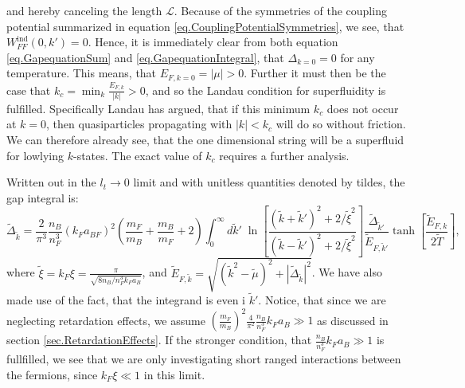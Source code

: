 and hereby canceling the length $\mathcal{L}$. Because of the symmetries of the coupling potential summarized in equation \eqref{eq.CouplingPotentialSymmetries}, we see, that $W^\text{ind}_{FF}(0,k') = 0$. Hence, it is immediately clear from both equation \eqref{eq.GapequationSum} and \eqref{eq.GapequationIntegral}, that $\Delta_{k=0} = 0$ for any temperature. This means, that $E_{F,k=0} = |\mu| > 0$. Further it must then be the case that $k_c = \min_k \frac{E_{F,k}}{|k|} > 0$, and so the Landau condition for superfluidity is fulfilled\cite{LandauStatPhys2,PlischkeStatPhys}.
Specifically Landau has argued, that if this minimum $k_c$ does not occur at $k=0$, then quasiparticles propagating with $|k|< k_c$ will do so without friction. We can therefore already see, that the one dimensional string will be a superfluid for lowlying $k$-states. The exact value of $k_c$ requires a further analysis. 

Written out in the $l_t \to 0$ limit and with unitless quantities denoted by tildes, the gap integral is:
\begin{equation}
\tilde{\Delta}_{\tilde{k}} = \frac{2}{\pi^3}\frac{n_B}{n_F^3}(k_Fa_{BF})^2\left(\frac{m_F}{m_B} + \frac{m_B}{m_F}+ 2\right) \int_0^\infty d\tilde{k}' \; \ln\left[\frac{(\tilde{k}+\tilde{k}')^2+2/\tilde{\xi}^2}{(\tilde{k}-\tilde{k}')^2+2/\tilde{\xi}^2}\right] \frac{\tilde{\Delta}_{\tilde{k}'}}{\tilde{E}_{F,\tilde{k}'}}\tanh\left[\frac{\tilde{E}_{F,k}}{2\tilde{T}}\right],
\label{eq.GapequationIntegralUnitless}
\end{equation} 
where $\tilde{\xi} = k_F\xi = \frac{\pi}{\sqrt{8 n_B/n_F^3 k_Fa_B}}$, and $\tilde{E}_{F,\tilde{k}} = \sqrt{(\tilde{k}^2-\tilde{\mu})^2 + |\tilde{\Delta}_{\tilde{k}}|^2}$. We have also made use of the fact, that the integrand is even i $\tilde{k}'$. Notice, that since we are neglecting retardation effects, we assume $\left(\frac{m_F}{m_B}\right)^2\frac{4}{\pi^2}\frac{n_B}{n_F^3}k_Fa_B \gg 1$ as discussed in section \ref{sec.RetardationEffects}. If the stronger condition, that $\frac{n_B}{n_F^3}k_Fa_B \gg 1$ is fullfilled, we see that we are only investigating short ranged interactions between the fermions, since $k_F\xi \ll 1$ in this limit. 

